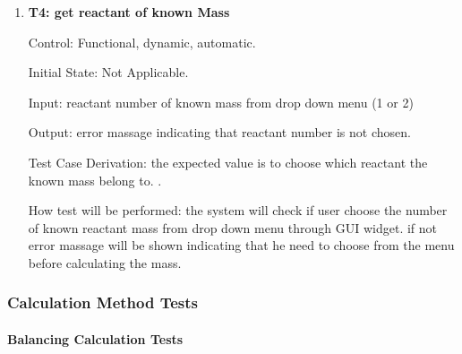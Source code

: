 \documentclass[12pt, titlepage]{article}
\begin{document}
\begin{enumerate}
\item{\bf T4: get reactant of known Mass  \\}

Control: Functional, dynamic, automatic.
					
Initial State: Not Applicable.
					
Input: reactant number of known mass from drop down menu (1 or 2) 

Output: error massage indicating that reactant number is not chosen.

Test Case Derivation: the expected value is to choose which reactant the known mass belong to. . 
					
How test will be performed: 
the system will check if user choose the number of known reactant mass from drop down menu through GUI widget. if not error massage will be shown indicating that he need to choose from the menu before calculating the mass. 

\end{enumerate}

\subsubsection{Calculation Method Tests}

\paragraph{Balancing Calculation Tests}
\end{document}
